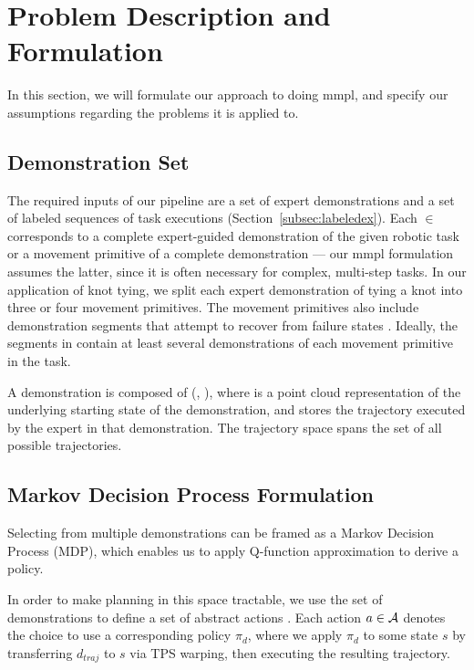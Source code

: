 \section{Problem Description and Formulation}
\label{sec:formulation}
%

In this section, we will formulate our approach to doing {\sc mmpl}, and
specify our assumptions regarding the problems it is applied to.

\subsection{Demonstration Set}

The required inputs of our pipeline are a set \demoset{}
of expert demonstrations and a set  of labeled sequences of
task executions (Section~\ref{subsec:labeledex}).
Each \demovar{} $\in$ \demoset{} corresponds to a complete expert-guided
demonstration of the given robotic task or a movement primitive of a complete
demonstration --- our {\sc mmpl} formulation assumes the latter,
since it is often necessary for complex, multi-step tasks.
In our application of knot tying, we split each expert demonstration of
tying a knot into three or four movement primitives. The movement primitives
also include demonstration segments that attempt to
recover from failure states \cite{Schulmanetal_ISRR2013}.
Ideally, the segments in \demoset{} contain at least several demonstrations
of each movement primitive in the task.

A demonstration \demovar{} is composed of (, ),
where  is a point cloud representation of the underlying
starting state of the demonstration, and  stores
the trajectory executed by the expert in that demonstration. The trajectory
space \trajset{} spans the set of all possible trajectories.


\subsection{Markov Decision Process Formulation}
Selecting from multiple demonstrations can be framed as a Markov Decision
Process (MDP), which enables us to apply Q-function approximation to derive a
policy.

In order to make planning in this space tractable, we use the set of
demonstrations \demoset{} to define a set of abstract actions \actionset{}. Each
action $a \in \mathcal{A}$ denotes the choice to use a corresponding
policy $\pi_d$, where we apply $\pi_d$ to some state $s$ by transferring
$d_{traj}$ to $s$ via TPS warping, then executing the resulting trajectory.

